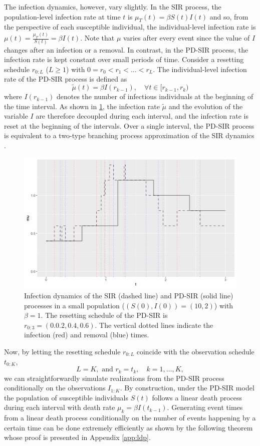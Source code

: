 \documentclass[11pt]{article}
\begin{document}
	The infection dynamics, however, vary slightly.
	In the SIR process, the population-level infection rate at time $t$ is $\mu_T(t) = \beta S(t)I(t)$ and so, from the perspective of each susceptible individual, the individual-level infection rate is $\mu(t) = \frac{\mu_T(t)}{S(t)} = \beta I(t)$. Note that $\mu$ varies after every event since the value of $I$ changes after an infection or a removal.
	In contrast, in the PD-SIR process, the infection rate is kept constant over small periods of time. Consider a resetting schedule $r_{0:L}$ ($L\ge1$) with $0 = r_0 < r_1 < \dots < r_L$. The individual-level infection rate of the PD-SIR process is defined as
	$$\tilde{\mu}(t) = \beta I(r_{k - 1}), \quad \forall t \in [r_{k - 1}, r_k)$$
	where $I(r_{k-1})$ denotes the number of infectious individuals at the beginning of the time interval. As shown in \ref{fig:mu}, the infection rate $\tilde{\mu}$ and the evolution of the variable $I$ are therefore decoupled during each interval, and the infection rate is reset at the beginning %
	of the intervals. Over a single interval, the PD-SIR process is equivalent to a two-type branching process approximation of the SIR dynamics \cite{Ho.2018}. 
	
	\begin{figure}
		\centering
		\includegraphics[scale = 0.6]{infection_rate_SIR_PDSIR.jpg}
		\caption{Infection dynamics of the SIR (dashed line) and PD-SIR (solid line) processes in a small population ($(S(0), I(0)) = (10,2)$) with $\beta=1$. The resetting schedule of the PD-SIR is $r_{0:3}=(0.0.2, 0.4, 0.6)$.
		The vertical dotted lines indicate the infection (red) and removal (blue) times.}
		\label{fig:mu}
	\end{figure}
	
	Now, by letting the resetting schedule $r_{0:L}$ coincide with the observation schedule $t_{0:K}$,
	$$L = K, \text{ and } r_k = t_k, \quad k=1,\dots,K,$$
	we can straightforwardly simulate realizations from the PD-SIR process conditionally on the observations $I_{1:K}$. By construction, under the PD-SIR model the population of susceptible individuals $S(t)$ follows a linear death process during each interval with death rate $\mu_k = \beta I(t_{k-1})$. Generating event times from a linear death process conditionally on the number of events happening by a certain time can be done extremely efficiently as shown by the following theorem whose proof is presented in Appendix \ref{app:ldp}.
	
\end{document}
